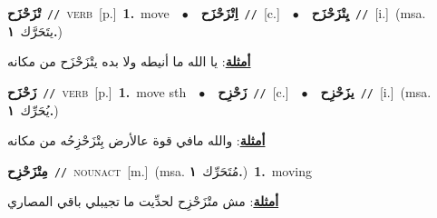 \documentclass[10pt,a4paper,twoside]{article} %
\begin{document}
\begin{multicols}{2}
{\setlength\topsep{0pt}\textbf{\foreignlanguage{arabic}{تْزَحْزَح}}\ {\color{gray}\texttt{//}\color{black}}\ \textsc{verb}\ [p.]\ \textbf{1.}~move\ \ $\bullet$\ \ \setlength\topsep{0pt}\textbf{\foreignlanguage{arabic}{اِتْزَحْزَح}}\ {\color{gray}\texttt{//}\color{black}}\ [c.]\ \ $\bullet$\ \ \setlength\topsep{0pt}\textbf{\foreignlanguage{arabic}{يِتْزَحْزَح}}\ {\color{gray}\texttt{//}\color{black}}\ [i.]\ \color{gray}(msa. \foreignlanguage{arabic}{يتَحَرَّك}~\foreignlanguage{arabic}{\textbf{١.}})\color{black}\  \begin{flushright}\color{gray}\foreignlanguage{arabic}{\textbf{\underline{\foreignlanguage{arabic}{أمثلة}}}: يا الله ما أنيطه ولا بده يتْزَحْزَح من مكانه}\end{flushright}\color{black}} \vspace{2mm}

{\setlength\topsep{0pt}\textbf{\foreignlanguage{arabic}{زَحْزَح}}\ {\color{gray}\texttt{//}\color{black}}\ \textsc{verb}\ [p.]\ \textbf{1.}~move sth\ \ $\bullet$\ \ \setlength\topsep{0pt}\textbf{\foreignlanguage{arabic}{زَحْزِح}}\ {\color{gray}\texttt{//}\color{black}}\ [c.]\ \ $\bullet$\ \ \setlength\topsep{0pt}\textbf{\foreignlanguage{arabic}{يزَحْزِح}}\ {\color{gray}\texttt{//}\color{black}}\ [i.]\ \color{gray}(msa. \foreignlanguage{arabic}{يُحَرِّك}~\foreignlanguage{arabic}{\textbf{١.}})\color{black}\  \begin{flushright}\color{gray}\foreignlanguage{arabic}{\textbf{\underline{\foreignlanguage{arabic}{أمثلة}}}: والله مافي قوة عالأرض بِتْزَحْزِحُه من مكانه}\end{flushright}\color{black}} \vspace{2mm}

{\setlength\topsep{0pt}\textbf{\foreignlanguage{arabic}{مِتْزَحْزِح}}\ {\color{gray}\texttt{//}\color{black}}\ \textsc{noun\textunderscore act}\ [m.]\ \color{gray}(msa. \foreignlanguage{arabic}{مُتَحَرِّك}~\foreignlanguage{arabic}{\textbf{١.}})\color{black}\ \textbf{1.}~moving\  \begin{flushright}\color{gray}\foreignlanguage{arabic}{\textbf{\underline{\foreignlanguage{arabic}{أمثلة}}}: مش متْزَحْزِح لحدِّيت ما تجيبلي باقي المصاري}\end{flushright}\color{black}} \vspace{2mm}


\end{multicols}
\end{document}
